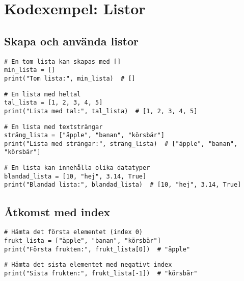 \section{Kodexempel: Listor}
\label{examples:lists}
\subsection*{Skapa och använda listor}

\begin{lstlisting}[title=Exempel 1: Skapa en tom lista]
# En tom lista kan skapas med []
min_lista = []
print("Tom lista:", min_lista)  # []
\end{lstlisting}

\begin{lstlisting}[title=Exempel 2: Skapa en lista med tal]
# En lista med heltal
tal_lista = [1, 2, 3, 4, 5]
print("Lista med tal:", tal_lista)  # [1, 2, 3, 4, 5]
\end{lstlisting}

\begin{lstlisting}[title=Exempel 3: Skapa en lista med strängar]
# En lista med textsträngar
sträng_lista = ["äpple", "banan", "körsbär"]
print("Lista med strängar:", sträng_lista)  # ["äpple", "banan", "körsbär"]
\end{lstlisting}

\begin{lstlisting}[title=Exempel 4: Blandad lista]
# En lista kan innehålla olika datatyper
blandad_lista = [10, "hej", 3.14, True]
print("Blandad lista:", blandad_lista)  # [10, "hej", 3.14, True]
\end{lstlisting}

\subsection*{Åtkomst med index}

\begin{lstlisting}[title=Exempel 5: Hämta ett element med index]
# Hämta det första elementet (index 0)
frukt_lista = ["äpple", "banan", "körsbär"]
print("Första frukten:", frukt_lista[0])  # "äpple"
\end{lstlisting}

\begin{lstlisting}[title=Exempel 6: Hämta det sista elementet]
# Hämta det sista elementet med negativt index
print("Sista frukten:", frukt_lista[-1])  # "körsbär"
\end{lstlisting}

